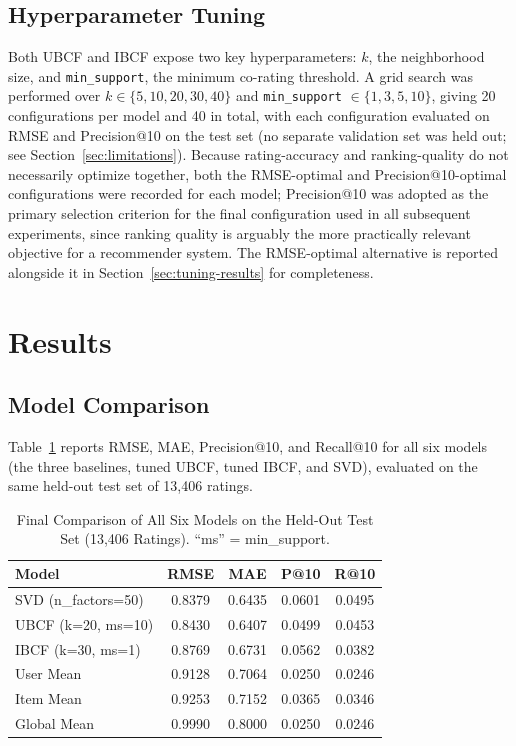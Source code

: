 \documentclass[conference]{IEEEtran}
\begin{document}
\subsection{Hyperparameter Tuning}
\label{sec:tuning}
Both UBCF and IBCF expose two key hyperparameters: $k$, the neighborhood size, and \texttt{min\_support}, the minimum co-rating threshold. A grid search was performed over $k \in \{5, 10, 20, 30, 40\}$ and \texttt{min\_support} $\in \{1, 3, 5, 10\}$, giving 20 configurations per model and 40 in total, with each configuration evaluated on RMSE and Precision@10 on the test set (no separate validation set was held out; see Section~\ref{sec:limitations}). Because rating-accuracy and ranking-quality do not necessarily optimize together, both the RMSE-optimal and Precision@10-optimal configurations were recorded for each model; Precision@10 was adopted as the primary selection criterion for the final configuration used in all subsequent experiments, since ranking quality is arguably the more practically relevant objective for a recommender system. The RMSE-optimal alternative is reported alongside it in Section~\ref{sec:tuning-results} for completeness.

\section{Results}
\label{sec:results}

\subsection{Model Comparison}
Table~\ref{tab:comparison} reports RMSE, MAE, Precision@10, and Recall@10 for all six models (the three baselines, tuned UBCF, tuned IBCF, and SVD), evaluated on the same held-out test set of 13,406 ratings.

\begin{table}[htbp]
\caption{Final Comparison of All Six Models on the Held-Out Test Set (13,406 Ratings). ``ms'' = min\_support.}
\begin{center}
\begin{tabular}{|l|c|c|c|c|}
\hline
\textbf{Model} & \textbf{RMSE} & \textbf{MAE} & \textbf{P@10} & \textbf{R@10} \\
\hline
SVD (n\_factors=50) & 0.8379 & 0.6435 & 0.0601 & 0.0495 \\
\hline
UBCF (k=20, ms=10) & 0.8430 & 0.6407 & 0.0499 & 0.0453 \\
\hline
IBCF (k=30, ms=1) & 0.8769 & 0.6731 & 0.0562 & 0.0382 \\
\hline
User Mean & 0.9128 & 0.7064 & 0.0250 & 0.0246 \\
\hline
Item Mean & 0.9253 & 0.7152 & 0.0365 & 0.0346 \\
\hline
Global Mean & 0.9990 & 0.8000 & 0.0250 & 0.0246 \\
\hline
\end{tabular}
\label{tab:comparison}
\end{center}
\end{table}
\end{document}
